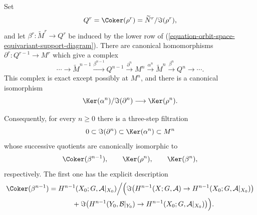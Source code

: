 \begin{lemma}
Set
$$
Q^r=\Coker(\rho^r)
=\widetilde N^r/\Im(\rho^r),
$$
and let $\beta^r:\widetilde M^r\to Q^r$ be induced by the lower row of
(\ref{equation-orbit-space-equivariant-support-diagram}). There are
canonical homomorphisms $\partial^r:Q^{r-1}\to M^r$ which give a complex
\begin{equation}
\label{equation-orbit-space-equivariant-support-complex}
\cdots\longrightarrow
\widetilde M^{n-1}\xrightarrow{\beta^{n-1}}Q^{n-1}
\xrightarrow{\partial^n}M^n
\xrightarrow{\alpha^n}\widetilde M^n
\xrightarrow{\beta^n}Q^n\longrightarrow\cdots.
\end{equation}
This complex is exact except possibly at $M^n$, and there is a canonical
isomorphism
$$
\Ker(\alpha^n)/\Im(\partial^n)
\longrightarrow
\Ker(\rho^n).
$$

Consequently, for every $n\geq0$ there is a three-step filtration
$$
0\subset\Im(\partial^n)\subset\Ker(\alpha^n)\subset M^n
$$
whose successive quotients are canonically isomorphic to
$$
\Coker(\beta^{n-1}),\qquad
\Ker(\rho^n),\qquad
\Ker(\beta^n),
$$
respectively. The first one has the explicit description
\begin{align*}
\Coker(\beta^{n-1})
={}&H^{n-1}(X_0;G,\mathcal{A}|_{X_0})\Big/
\Big(
\Im\bigl(H^{n-1}(X;G,\mathcal{A})\to
H^{n-1}(X_0;G,\mathcal{A}|_{X_0})\bigr)\\
&\qquad+\Im\bigl(H^{n-1}(Y_0,\mathcal{B}|_{Y_0})\to
H^{n-1}(X_0;G,\mathcal{A}|_{X_0})\bigr)\Big).
\end{align*}
\end{lemma}

